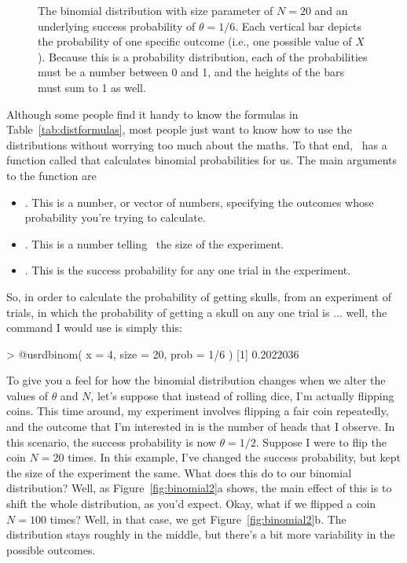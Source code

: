 \begin{figure}[t]
\begin{center}
\caption{The binomial distribution with size parameter of $N=20$ and an underlying success probability of $\theta = 1/6$. Each vertical bar depicts the probability of one specific outcome (i.e., one possible value of $X$). Because this is a probability distribution, each of the probabilities must be a number between 0 and 1, and the heights of the bars must sum to 1 as well.}
\HR
\label{fig:binomial1}
\end{center}
\end{figure}




Although some people find it handy to know the formulas in Table~\ref{tab:distformulas}, most people just want to know how to use the distributions without worrying too much about the maths. To that end, \R\ has a function called  that calculates binomial probabilities for us. The main arguments to the function are 
\begin{itemize}
\item {}. This is a number, or vector of numbers, specifying the outcomes whose probability you're trying to calculate.
\item {}. This is a number telling \R\ the size of the experiment.
\item {}. This is the success probability for any one trial in the experiment.
\end{itemize}
So, in order to calculate the probability of getting  skulls, from an experiment of  trials, in which the probability of getting a skull on any one trial is  ... well, the command I would use is simply this:
\begin{rblock1}
> @usr{dbinom( x = 4, size = 20, prob = 1/6 )}
[1] 0.2022036
\end{rblock1} 




To give you a feel for how the binomial distribution changes when we alter the values of $\theta$ and $N$, let's suppose that instead of rolling dice, I'm actually flipping coins. This time around, my experiment involves flipping a fair coin repeatedly, and the outcome that I'm interested in is the number of heads that I observe. In this scenario, the success probability is now $\theta = 1/2$. Suppose I were to flip the coin $N=20$ times. In this example, I've changed the success probability, but kept the size of the experiment the same. What does this do to our binomial distribution? Well, as Figure~\ref{fig:binomial2}a shows, the main effect of this is to shift the whole distribution, as you'd expect. Okay, what if we flipped a coin $N=100$ times? Well, in that case, we get Figure~\ref{fig:binomial2}b. The distribution stays roughly in the middle, but there's a bit more variability in the possible outcomes. 

